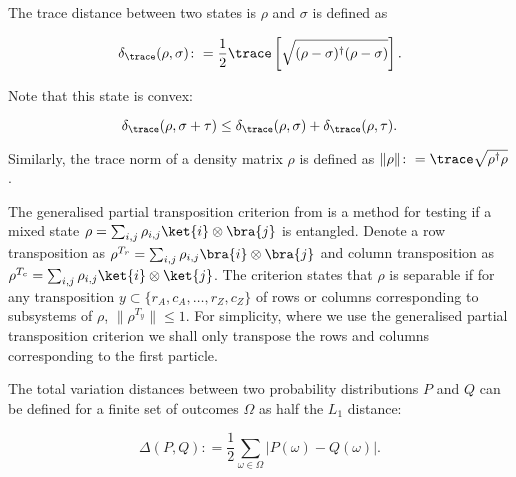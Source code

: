 The trace distance between two states is $\rho$ and $\sigma$ is defined as

\begin{equation}
\delta_{\trace}(\rho, \sigma) \colon= \frac{1}{2}\trace\left[\sqrt{(\rho-\sigma)^\dagger(\rho-\sigma)}\right].
\end{equation}

\noindent Note that this state is convex:

\begin{equation}
\delta_{\trace}(\rho, \sigma + \tau) \leq \delta_{\trace}(\rho, \sigma) + \delta_{\trace}(\rho, \tau).
\end{equation}

\noindent Similarly, the trace norm of a density matrix $\rho$ is defined as $\|\rho\| \colon= \trace\sqrt{\rho^\dagger\rho}$.

The generalised partial transposition criterion from \cite{chen2002} is a method for testing if a mixed state $\rho = \sum_{i,j}\rho_{i,j}\ket{i}\otimes\bra{j}$ is entangled. Denote a row transposition as $\rho^{T_{r}} = \sum_{i,j}\rho_{i,j}\bra{i}\otimes\bra{j}$ and column transposition as $\rho^{T_{c}} = \sum_{i,j}\rho_{i,j}\ket{i}\otimes\ket{j}$. The criterion states that $\rho$ is separable if for any transposition $y \subset \{r_A,c_A,\dots,r_Z,c_Z\}$ of rows or columns corresponding to subsystems of $\rho$, $\|\rho^{T_y}\| \leq 1$. For simplicity, where we use the generalised partial transposition criterion we shall only transpose the rows and columns corresponding to the first particle.

The total variation distances between two probability distributions $P$ and $Q$ can be defined for a finite set of outcomes $\Omega$ as half the $L_1$ distance:

\begin{equation}
\Delta(P, Q) \colon= \frac{1}{2}\sum_{\omega \in \Omega}|P(\omega) - Q(\omega)|.
\end{equation}
